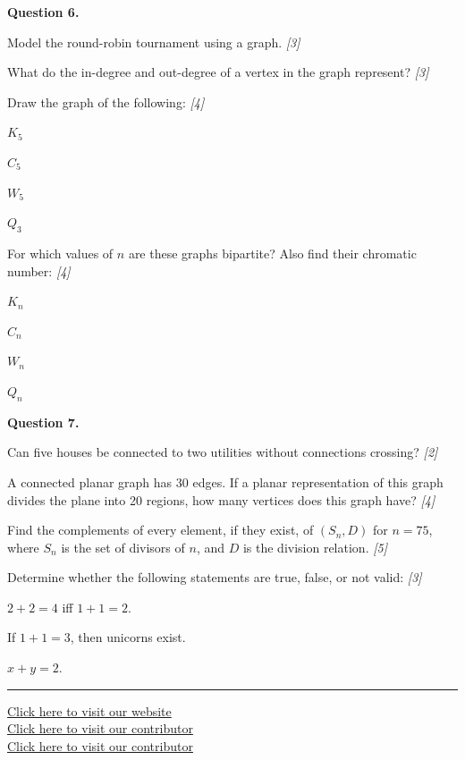 \documentclass[11pt,a4paper]{article}
\newcommand{\pts}[1]{\hfill   \textit{[#1]}}
\begin{document}
\medskip


\noindent   \textbf{Question 6.}

\begin{parts}
  \item Model the round-robin tournament using a graph. \pts{3}
  \item What do the in-degree and out-degree of a vertex in the graph represent? \pts{3}
  \item Draw the graph of the following: \pts{4}
  
\begin{parts}
    \item $K_5$
    \item $C_5$
    \item $W_5$
    \item $Q_3$
  \end{parts}
  \item For which values of $n$ are these graphs bipartite? Also find their chromatic number: \pts{4}
  
\begin{parts}
    \item $K_n$
    \item $C_n$
    \item $W_n$
    \item $Q_n$
  \end{parts}
\end{parts}

\medskip


\noindent   \textbf{Question 7.}

\begin{parts}
  \item Can five houses be connected to two utilities without connections crossing? \pts{2}
  \item A connected planar graph has 30 edges. If a planar representation of this graph divides the plane into 20 regions, how many vertices does this graph have? \pts{4}
  \item Find the complements of every element, if they exist, of $(S_n, D)$ for $n = 75$, where $S_n$ is the set of divisors of $n$, and $D$ is the division relation. \pts{5}
  \item Determine whether the following statements are true, false, or not valid: \pts{3}
  
\begin{parts}
    \item $2+2=4$ iff $1+1=2$.
    \item If $1+1=3$, then unicorns exist.
    \item $x + y = 2$.
  \end{parts}
\end{parts}

\vfill
\rule{\linewidth}{0.4pt}

\begin{center}\small
\href{https://bhu-exam.vercel.app/}{Click here to visit our website}\\[4pt]\href{https://me-aryan.vercel.app/}{Click here to visit our contributor}\\[4pt]\href{https://quashan-me.vercel.app/}{Click here to visit our contributor}
\end{center}
\end{document}
